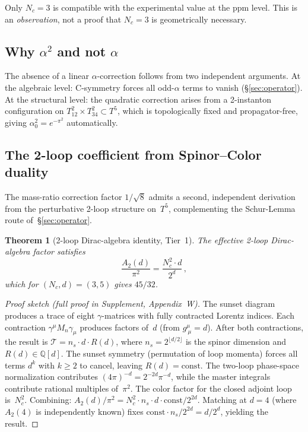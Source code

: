 \documentclass[11pt,a4paper]{article}
\newtheorem{theorem}{Theorem}
\theoremstyle{definition}
\theoremstyle{remark}
\begin{document}
Only $N_c=3$ is compatible with the experimental value at the
ppm level.  This is an \emph{observation}, not a proof that
$N_c=3$ is geometrically necessary.

\subsection{Why $\alpha^2$ and not $\alpha$}

The absence of a linear $\alpha$-correction follows from two independent
arguments.  At the algebraic level: C-symmetry forces all odd-$\alpha$
terms to vanish (\S\ref{sec:operator}).  At the structural level: the
quadratic correction arises from a 2-instanton configuration on
$T^2_{12}\times T^2_{34}\subset T^5$, which is topologically fixed and
propagator-free, giving $\alpha_0^2=e^{-\pi^2}$ automatically.

\subsection{The 2-loop coefficient from Spinor--Color duality}

The mass-ratio correction factor $1/\sqrt{8}$ admits a second, independent
derivation from the perturbative 2-loop structure on~$T^5$, complementing
the Schur-Lemma route of~\S\ref{sec:operator}.

\begin{theorem}[2-loop Dirac-algebra identity, Tier~1]\label{thm:2loop}
The effective 2-loop Dirac-algebra factor satisfies
\begin{equation}\label{eq:A2decomp}
  \frac{A_2(d)}{\pi^2} = \frac{N_c^2\cdot d}{2^d}\,,
\end{equation}
which for $(N_c,d)=(3,5)$ gives $45/32$.
\end{theorem}

\begin{proof}[Proof sketch {\upshape(full proof in Supplement, Appendix~W)}]
The sunset diagram produces a trace of eight $\gamma$-matrices with
fully contracted Lorentz indices.  Each contraction
$\gamma^\mu M_n\gamma_\mu$ produces factors of~$d$ (from
$g^\mu_{\ \mu}=d$).  After both contractions, the result is
$\mathcal{T}=n_s\cdot d\cdot R(d)$, where $n_s=2^{\lfloor d/2\rfloor}$
is the spinor dimension and $R(d)\in\mathbb{Q}[d]$.  The sunset
symmetry (permutation of loop momenta) forces all terms $d^k$ with
$k\geq 2$ to cancel, leaving $R(d)=\mathrm{const}$.  The two-loop
phase-space normalization contributes $(4\pi)^{-d}=2^{-2d}\pi^{-d}$,
while the master integrals contribute rational multiples of~$\pi^2$.
The color factor for the closed adjoint loop is~$N_c^2$.  Combining:
$A_2(d)/\pi^2 = N_c^2\cdot n_s\cdot d\cdot\mathrm{const}/2^{2d}$.
Matching at $d=4$ (where $A_2(4)$ is independently known) fixes
$\mathrm{const}\cdot n_s/2^{2d}=d/2^d$, yielding the result.
\end{proof}
\end{document}
